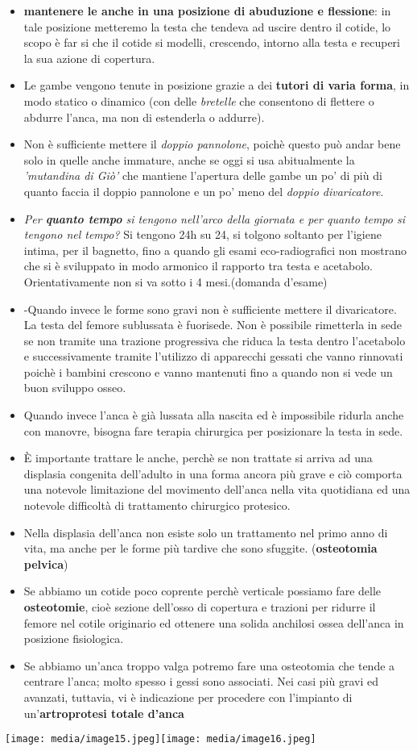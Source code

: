 \documentclass[]{article}
\begin{document}
\begin{itemize}
\item
  \textbf{mantenere le anche in una posizione di abuduzione e
  flessione}: in tale posizione metteremo la testa che tendeva ad uscire
  dentro il cotide, lo scopo è far si che il cotide si modelli,
  crescendo, intorno alla testa e recuperi la sua azione di copertura.
\item
  Le gambe vengono tenute in posizione grazie a dei \textbf{tutori di
  varia forma}, in modo statico o dinamico (con delle \emph{bretelle}
  che consentono di flettere o abdurre l'anca, ma non di estenderla o
  addurre).
\item
  Non è sufficiente mettere il \emph{doppio pannolone}, poichè questo
  può andar bene solo in quelle anche immature, anche se oggi si usa
  abitualmente la \emph{'mutandina di Giò'} che mantiene l'apertura
  delle gambe un po' di più di quanto faccia il doppio pannolone e un
  po' meno del \emph{doppio divaricatore}.
\item
  \emph{Per \textbf{quanto tempo} si tengono nell'arco della giornata e
  per quanto tempo si tengono nel tempo?} Si tengono 24h su 24, si
  tolgono soltanto per l'igiene intima, per il bagnetto, fino a quando
  gli esami eco-radiografici non mostrano che si è sviluppato in modo
  armonico il rapporto tra testa e acetabolo. Orientativamente non si va
  sotto i 4 mesi.(domanda d'esame)
\item
  -Quando invece le forme sono gravi non è sufficiente mettere il
  divaricatore. La testa del femore sublussata è fuorisede. Non è
  possibile rimetterla in sede se non tramite una trazione progressiva
  che riduca la testa dentro l'acetabolo e successivamente tramite
  l'utilizzo di apparecchi gessati che vanno rinnovati poichè i bambini
  crescono e vanno mantenuti fino a quando non si vede un buon sviluppo
  osseo.
\item
  Quando invece l'anca è già lussata alla nascita ed è impossibile
  ridurla anche con manovre, bisogna fare terapia chirurgica per
  posizionare la testa in sede.
\item
  È importante trattare le anche, perchè se non trattate si arriva ad
  una displasia congenita dell'adulto in una forma ancora più grave e
  ciò comporta una notevole limitazione del movimento dell'anca nella
  vita quotidiana ed una notevole difficoltà di trattamento chirurgico
  protesico.
\item
  Nella displasia dell'anca non esiste solo un trattamento nel primo
  anno di vita, ma anche per le forme più tardive che sono sfuggite.
  (\textbf{osteotomia pelvica})
\item
  Se abbiamo un cotide poco coprente perchè verticale possiamo fare
  delle \textbf{osteotomie}, cioè sezione dell'osso di copertura e
  trazioni per ridurre il femore nel cotile originario ed ottenere una
  solida anchilosi ossea dell'anca in posizione fisiologica.
\item
  Se abbiamo un'anca troppo valga potremo fare una osteotomia che tende
  a centrare l'anca; molto spesso i gessi sono associati. Nei casi più
  gravi ed avanzati, tuttavia, vi è indicazione per procedere con
  l'impianto di un'\textbf{artroprotesi totale d'anca}
\end{itemize}

\texttt{[image: media/image15.jpeg]}\texttt{[image: media/image16.jpeg]}
\end{document}
